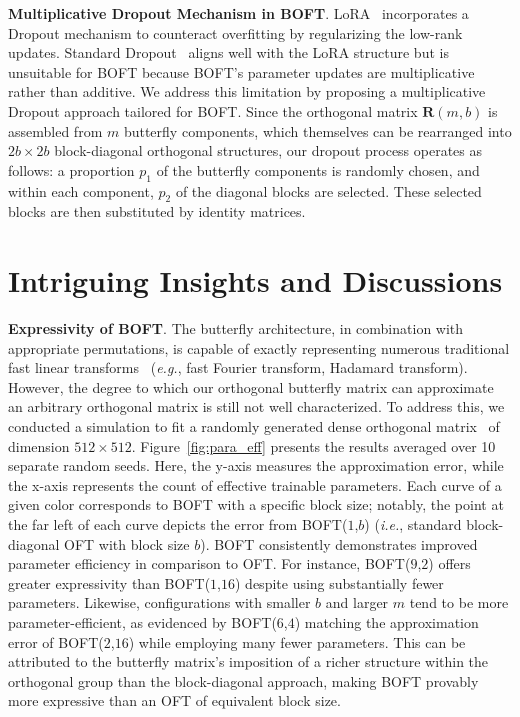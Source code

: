 \textbf{Multiplicative Dropout Mechanism in BOFT}. LoRA~\cite{hulora2022} incorporates a Dropout mechanism to counteract overfitting by regularizing the low-rank updates. Standard Dropout~\cite{srivastava2014dropout} aligns well with the LoRA structure but is unsuitable for BOFT because BOFT's parameter updates are multiplicative rather than additive. We address this limitation by proposing a multiplicative Dropout approach tailored for BOFT. Since the orthogonal matrix $\bm{R}(m,b)$ is assembled from $m$ butterfly components, which themselves can be rearranged into $2b \times 2b$ block-diagonal orthogonal structures, our dropout process operates as follows: a proportion $p_1$ of the butterfly components is randomly chosen, and within each component, $p_2$ of the diagonal blocks are selected. These selected blocks are then substituted by identity matrices.

\section{Intriguing Insights and Discussions}

\textbf{Expressivity of BOFT}. The butterfly architecture, in combination with appropriate permutations, is capable of exactly representing numerous traditional fast linear transforms~\cite{dao2019learning,dao2019kaleidoscope} (\emph{e.g.}, fast Fourier transform, Hadamard transform). However, the degree to which our orthogonal butterfly matrix can approximate an arbitrary orthogonal matrix is still not well characterized. To address this, we conducted a simulation to fit a randomly generated dense orthogonal matrix~\cite{anderson1987generation} of dimension $512\times 512$. Figure~\ref{fig:para_eff} presents the results averaged over 10 separate random seeds. Here, the y-axis measures the approximation error, while the x-axis represents the count of effective trainable parameters. Each curve of a given color corresponds to BOFT with a specific block size; notably, the point at the far left of each curve depicts the error from BOFT($1$,$b$) (\emph{i.e.}, standard block-diagonal OFT with block size $b$). BOFT consistently demonstrates improved parameter efficiency in comparison to OFT. For instance, BOFT($9$,$2$) offers greater expressivity than BOFT($1$,$16$) despite using substantially fewer parameters. Likewise, configurations with smaller $b$ and larger $m$ tend to be more parameter-efficient, as evidenced by BOFT($6$,$4$) matching the approximation error of BOFT($2$,$16$) while employing many fewer parameters. This can be attributed to the butterfly matrix’s imposition of a richer structure within the orthogonal group than the block-diagonal approach, making BOFT provably more expressive than an OFT of equivalent block size.

